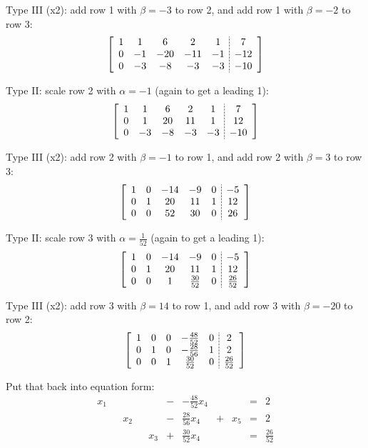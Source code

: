 Type III (x2): add row 1 with $\beta=-3$ to row 2, and add row 1 with $\beta=-2$ to row 3:
\[\left[\begin{array}{ccccc;{2pt/1pt}c} 
1 & 1 & 6 & 2 &  1 & 7\\
0 & -1 & -20 & -11 &  -1 & -12\\
0 & -3 & -8 & -3 & -3 & -10\\
\end{array}\right]\]

Type II: scale row 2 with $\alpha=-1$ (again to get a leading 1):
\[\left[\begin{array}{ccccc;{2pt/1pt}c} 
1 & 1 & 6 & 2 &  1 & 7\\
0 & 1 & 20 & 11 &  1 & 12\\
0 & -3 & -8 & -3 & -3 & -10\\
\end{array}\right]\]

Type III (x2): add row 2 with $\beta=-1$ to row 1, and add row 2 with $\beta=3$ to row 3:
\[\left[\begin{array}{ccccc;{2pt/1pt}c} 
1 & 0 & -14 & -9 &  0 & -5\\
0 & 1 & 20 & 11 &  1 & 12\\
0 & 0 & 52 & 30 & 0 & 26\\
\end{array}\right]\]


Type II: scale row 3 with $\alpha=\frac{1}{52}$ (again to get a leading 1):
\[\left[\begin{array}{ccccc;{2pt/1pt}c} 
1 & 0 & -14 & -9 &  0 & -5\\
0 & 1 & 20 & 11 &  1 & 12\\
0 & 0 & 1 & \frac{30}{52} & 0 & \frac{26}{52}\\
\end{array}\right]\]

Type III (x2): add row 3 with $\beta=14$ to row 1, and add row 3 with $\beta=-20$ to row 2:
\[\left[\begin{array}{ccccc;{2pt/1pt}c} 
1 & 0 & 0 & -\frac{48}{52} &  0 & 2\\
0 & 1 & 0 & -\frac{28}{56} &  1 & 2\\
0 & 0 & 1 & \frac{30}{52} & 0 & \frac{26}{52}\\
\end{array}\right]\]

Put that back into equation form:
\[\begin{array}{rcrcrcrcrcr}
x_1 &  & & &  & - & -\frac{48}{52}x_4 &  & & = & 2\\
&  & x_2 & &  & - & \frac{28}{56} x_4 & + & x_5 & = & 2\\
&  & &  & x_3 & + & \frac{30}{52}x_4 &  & & = & \frac{26}{52}\\
\end{array}\]

